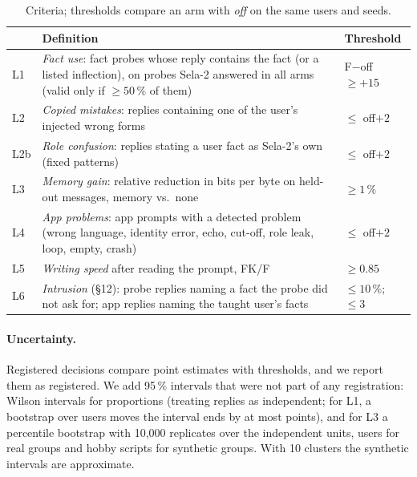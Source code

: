 \documentclass[10pt,twocolumn]{article}
\newcommand{\pct}{\,\%}
\begin{document}
\begin{table}[t]
\centering
\footnotesize
\setlength{\tabcolsep}{3pt}
\caption{Criteria; thresholds compare an arm with \emph{off} on the same users and seeds.}
\label{tab:criteria}
\begin{tabularx}{\columnwidth}{@{}lXl@{}}
\toprule
& Definition & Threshold \\
\midrule
L1 & \emph{Fact use}: fact probes whose reply contains the fact (or a listed inflection), on probes Sela-2 answered in all arms (valid only if $\geq 50\pct$ of them) & F$-$off $\geq{+}15$ \\
L2 & \emph{Copied mistakes}: replies containing one of the user's injected wrong forms & $\leq$ off${+}2$ \\
L2b & \emph{Role confusion}: replies stating a user fact as Sela-2's own (fixed patterns) & $\leq$ off${+}2$ \\
L3 & \emph{Memory gain}: relative reduction in bits per byte on held-out messages, memory vs.\ none & $\geq 1\pct$ \\
L4 & \emph{App problems}: app prompts with a detected problem (wrong language, identity error, echo, cut-off, role leak, loop, empty, crash) & $\leq$ off${+}2$ \\
L5 & \emph{Writing speed} after reading the prompt, FK/F & $\geq 0.85$ \\
L6 & \emph{Intrusion} (\S12): probe replies naming a fact the probe did not ask for; app replies naming the taught user's facts & $\leq 10\pct$; $\leq 3$ \\
\bottomrule
\end{tabularx}
\end{table}

\paragraph{Uncertainty.} Registered decisions compare point estimates with thresholds, and we report them as registered.
We add 95\pct{} intervals that were not part of any registration: Wilson intervals \citep{wilson1927probable} for
proportions (treating replies as independent; for L1, a bootstrap over users moves the interval ends by at most
 points), and for
L3 a percentile bootstrap \citep{efron1993bootstrap} with 10{,}000 replicates over the independent units, users for real
groups and hobby scripts for synthetic groups. With 10 clusters the synthetic intervals are approximate.

\end{document}
